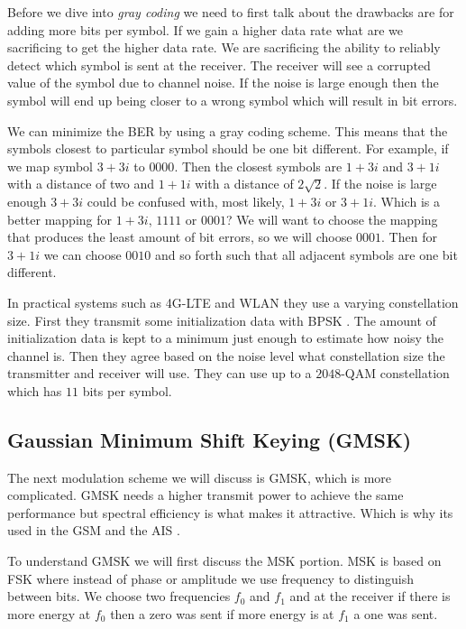 Before we dive into \emph{gray coding} we need to first talk about the drawbacks are for adding more bits per symbol. If we gain a higher data rate what are we sacrificing to get the higher data rate. We are sacrificing the ability to reliably detect which symbol is sent at the receiver. The receiver will see a corrupted value of the symbol due to channel noise. If the noise is large enough then the symbol will end up being closer to a wrong symbol which will result in bit errors.

We can minimize the \ac{BER} by using a gray coding scheme. This means that the symbols closest to particular symbol should be one bit different. For example, if we map symbol $3+3i$ to $0000$. Then the closest symbols are $1+3i$ and $3+1i$ with a distance of two and $1+1i$ with a distance of $2\sqrt{2}$. If the noise is large enough $3+3i$ could be confused with, most likely, $1+3i$ or $3+1i$. Which is a better mapping for $1+3i$, $1111$ or $0001$? We will want to choose the mapping that produces the least amount of bit errors, so we will choose $0001$. Then for $3+1i$ we can choose $0010$ and so forth such that all adjacent symbols are one bit different.

In practical systems such as \ac{4G-LTE} and \ac{WLAN} they use a varying constellation size. First they transmit some initialization data with \ac{BPSK} \cite{LTEBook}. The amount of initialization data is kept to a minimum just enough to estimate how noisy the channel is. Then they agree based on the noise level what constellation size the transmitter and receiver will use. They can use up to a $2048$-\ac{QAM} constellation which has $11$ bits per symbol.	
	
\subsection{Gaussian Minimum Shift Keying (GMSK)}

The next modulation scheme we will discuss is \ac{GMSK}, which is more complicated. \ac{GMSK} needs a higher transmit power to achieve the same performance but spectral efficiency is what makes it attractive. Which is why its used in the \ac{GSM} and the \ac{AIS} \cite{aisref}.

To understand \ac{GMSK} we will first discuss the \ac{MSK} portion. \ac{MSK} is based on \ac{FSK} where instead of phase or amplitude we use frequency to distinguish between bits. We choose two frequencies $f_0$ and $f_1$ and at the receiver if there is more energy at $f_0$ then a zero was sent if more energy is at $f_1$ a one was sent.

